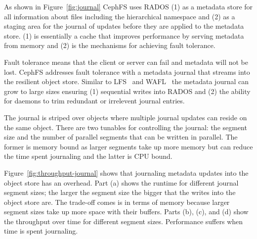 \documentclass[preprint]{sigplanconf-eurosys}
\begin{document}

As shown in Figure~\ref{fig:journal} CephFS uses RADOS (1) as a metadata store
for all information about files including the hierarchical namespace and (2) as
a staging area for the journal of updates before they are applied to the
metadata store. (1) is essentially a cache that improves performance by serving
metadata from memory and (2) is the mechanisms for achieving fault tolerance. 

Fault tolerance means that the client or server can fail and metadata will not
be lost.  CephFS addresses fault tolerance with a metadata journal that streams
into the resilient object store. Similar to LFS~\cite{} and WAFL~\cite{} the
metadata journal can grow to large sizes ensuring (1) sequential writes into
RADOS and (2) the ability for daemons to trim redundant or irrelevent journal
entries. 

The journal is striped over objects where multiple journal updates can reside
on the same object. There are two tunables for controlling the journal: the
segment size and the number of parallel segments that can be written in
parallel. The former is memory bound as larger segments take up more memory but
can reduce the time spent journaling and the latter is CPU bound. 

Figure~\ref{fig:throughput-journal} shows that journaling metadata updates into
the object store has an overhead. Part (a) shows the runtime for different
journal segment sizes; the larger the segment size the bigger that the writes
into the object store are. The trade-off comes is in terms of memory because
larger segment sizes take up more space with their buffers. Parts (b), (c), and
(d) show the throughput over time for different segment sizes. Performance
suffers when time is spent journaling. 
\end{document}
